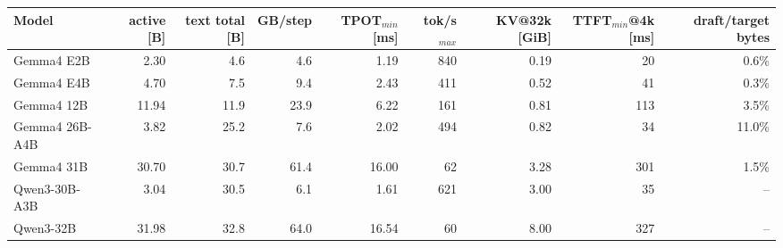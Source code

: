 \begin{tabular}{lrrrrrrrr}
\toprule
Model & active [B] & text total [B] & GB/step & TPOT$_{min}$ [ms] & tok/s$_{max}$ & KV@32k [GiB] & TTFT$_{min}$@4k [ms] & draft/target bytes \\
\midrule
Gemma4 E2B & 2.30 & 4.6 & 4.6 & 1.19 & 840 & 0.19 & 20 & 0.6\% \\
Gemma4 E4B & 4.70 & 7.5 & 9.4 & 2.43 & 411 & 0.52 & 41 & 0.3\% \\
Gemma4 12B & 11.94 & 11.9 & 23.9 & 6.22 & 161 & 0.81 & 113 & 3.5\% \\
Gemma4 26B-A4B & 3.82 & 25.2 & 7.6 & 2.02 & 494 & 0.82 & 34 & 11.0\% \\
Gemma4 31B & 30.70 & 30.7 & 61.4 & 16.00 & 62 & 3.28 & 301 & 1.5\% \\
Qwen3-30B-A3B & 3.04 & 30.5 & 6.1 & 1.61 & 621 & 3.00 & 35 & -- \\
Qwen3-32B & 31.98 & 32.8 & 64.0 & 16.54 & 60 & 8.00 & 327 & -- \\
\bottomrule
\end{tabular}
